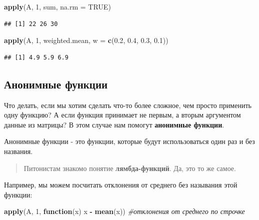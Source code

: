 \documentclass[
]{book}
\newenvironment{Shaded}{\begin{snugshade}}{\end{snugshade}}
\newcommand{\CommentTok}[1]{\textcolor[rgb]{0.56,0.35,0.01}{\textit{#1}}}
\newcommand{\ControlFlowTok}[1]{\textcolor[rgb]{0.13,0.29,0.53}{\textbf{#1}}}
\newcommand{\DataTypeTok}[1]{\textcolor[rgb]{0.13,0.29,0.53}{#1}}
\newcommand{\DecValTok}[1]{\textcolor[rgb]{0.00,0.00,0.81}{#1}}
\newcommand{\FloatTok}[1]{\textcolor[rgb]{0.00,0.00,0.81}{#1}}
\newcommand{\KeywordTok}[1]{\textcolor[rgb]{0.13,0.29,0.53}{\textbf{#1}}}
\newcommand{\NormalTok}[1]{#1}
\newcommand{\OperatorTok}[1]{\textcolor[rgb]{0.81,0.36,0.00}{\textbf{#1}}}
\newcommand{\OtherTok}[1]{\textcolor[rgb]{0.56,0.35,0.01}{#1}}
\newcommand{\StringTok}[1]{\textcolor[rgb]{0.31,0.60,0.02}{#1}}
\begin{document}
\begin{Shaded}
\begin{Highlighting}[]
\KeywordTok{apply}\NormalTok{(A, }\DecValTok{1}\NormalTok{, sum, }\DataTypeTok{na.rm =} \OtherTok{TRUE}\NormalTok{)}
\end{Highlighting}
\end{Shaded}

\begin{verbatim}
## [1] 22 26 30
\end{verbatim}

\begin{Shaded}
\begin{Highlighting}[]
\KeywordTok{apply}\NormalTok{(A, }\DecValTok{1}\NormalTok{, weighted.mean, }\DataTypeTok{w =} \KeywordTok{c}\NormalTok{(}\FloatTok{0.2}\NormalTok{, }\FloatTok{0.4}\NormalTok{, }\FloatTok{0.3}\NormalTok{, }\FloatTok{0.1}\NormalTok{)) }
\end{Highlighting}
\end{Shaded}

\begin{verbatim}
## [1] 4.9 5.9 6.9
\end{verbatim}

\hypertarget{anon_f}{%
\subsection{Анонимные функции}\label{anon_f}}

Что делать, если мы хотим сделать что-то более сложное, чем просто применить одну функцию? А если функция принимает не первым, а вторым аргументом данные из матрицы? В этом случае нам помогут \textbf{анонимные функции}.

Анонимные функции - это функции, которые будут использоваться один раз и без названия.

\begin{quote}
Питонистам знакомо понятие \textbf{лямбда-функций}. Да, это то же самое.
\end{quote}

Например, мы можем посчитать отклонения от среднего без называния этой функции:

\begin{Shaded}
\begin{Highlighting}[]
\KeywordTok{apply}\NormalTok{(A, }\DecValTok{1}\NormalTok{, }\ControlFlowTok{function}\NormalTok{(x) x }\OperatorTok{-}\StringTok{ }\KeywordTok{mean}\NormalTok{(x)) }\CommentTok{#отклонения от среднего по строчке}
\end{Highlighting}
\end{Shaded}
\end{document}
